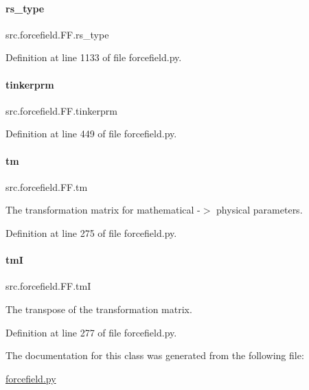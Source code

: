 \paragraph{\texorpdfstring{rs\+\_\+type}{rs\_type}}
{\footnotesize\ttfamily src.\+forcefield.\+F\+F.\+rs\+\_\+type}



Definition at line 1133 of file forcefield.\+py.

\mbox{\label{classsrc_1_1forcefield_1_1FF_a1c8278c8003961b043c8a6301ce49e18}} 
\paragraph{\texorpdfstring{tinkerprm}{tinkerprm}}
{\footnotesize\ttfamily src.\+forcefield.\+F\+F.\+tinkerprm}



Definition at line 449 of file forcefield.\+py.

\mbox{\label{classsrc_1_1forcefield_1_1FF_adcb95c2460b4c0f7893377a8758da6c2}} 
\paragraph{\texorpdfstring{tm}{tm}}
{\footnotesize\ttfamily src.\+forcefield.\+F\+F.\+tm}



The transformation matrix for mathematical -\/$>$ physical parameters. 



Definition at line 275 of file forcefield.\+py.

\mbox{\label{classsrc_1_1forcefield_1_1FF_a4069b737179fc0f4c02ce711564efcbf}} 
\paragraph{\texorpdfstring{tmI}{tmI}}
{\footnotesize\ttfamily src.\+forcefield.\+F\+F.\+tmI}



The transpose of the transformation matrix. 



Definition at line 277 of file forcefield.\+py.



The documentation for this class was generated from the following file\+:\begin{DoxyCompactItemize}
\item 
\hyperlink{forcefield_8py}{forcefield.\+py}\end{DoxyCompactItemize}
